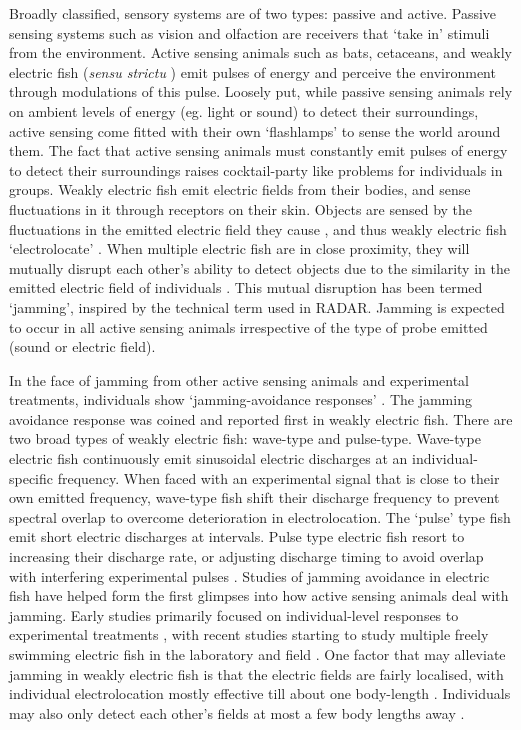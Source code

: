 \documentclass[
]{book}
\begin{document}
Broadly classified, sensory systems are of two types: passive and active. Passive sensing systems such as vision and olfaction are receivers that `take in' stimuli from the environment. Active sensing animals such as bats, cetaceans, and weakly electric fish (\emph{sensu strictu} \citet{nelson2006a}) emit pulses of energy and perceive the environment through modulations of this pulse. Loosely put, while passive sensing animals rely on ambient levels of energy (eg. light or sound) to detect their surroundings, active sensing come fitted with their own `flashlamps' to sense the world around them. The fact that active sensing animals must constantly emit pulses of energy to detect their surroundings raises cocktail-party like problems for individuals in groups. Weakly electric fish emit electric fields from their bodies, and sense fluctuations in it through receptors on their skin. Objects are sensed by the fluctuations in the emitted electric field they cause , and thus weakly electric fish `electrolocate' \citep{heiligenberg2012principles}. When multiple electric fish are in close proximity, they will mutually disrupt each other's ability to detect objects due to the similarity in the emitted electric field of individuals \citep{nelson2006a}. This mutual disruption has been termed `jamming', inspired by the technical term used in RADAR. Jamming is expected to occur in all active sensing animals irrespective of the type of probe emitted (sound or electric field).

In the face of jamming from other active sensing animals and experimental treatments, individuals show `jamming-avoidance responses' \citep{watanabe1963change, bullock1972jamming}. The jamming avoidance response was coined and reported first in weakly electric fish. There are two broad types of weakly electric fish: wave-type and pulse-type. Wave-type electric fish continuously emit sinusoidal electric discharges at an individual-specific frequency. When faced with an experimental signal that is close to their own emitted frequency, wave-type fish shift their discharge frequency to prevent spectral overlap to overcome deterioration in electrolocation. The `pulse' type fish emit short electric discharges at intervals. Pulse type electric fish resort to increasing their discharge rate, or adjusting discharge timing to avoid overlap with interfering experimental pulses \citep{heiligenberg2012principles}. Studies of jamming avoidance in electric fish have helped form the first glimpses into how active sensing animals deal with jamming. Early studies primarily focused on individual-level responses to experimental treatments \citep{heiligenberg2012principles}, with recent studies starting to study multiple freely swimming electric fish in the laboratory and field \citep{arnegard2005electric, tan2005electrosensory, donati2016investigation, henninger2020tracking}. One factor that may alleviate jamming in weakly electric fish is that the electric fields are fairly localised, with individual electrolocation mostly effective till about one body-length \citep{nelson2006a}. Individuals may also only detect each other's fields at most a few body lengths away \citep{knudsen1975spatial}.
\end{document}
